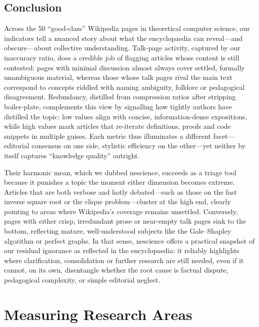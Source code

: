 \subsection{Conclusion}

Across the 50 “good-class” Wikipedia pages in theoretical computer science, our indicators tell a nuanced story about what the encyclopaedia can reveal—and obscure—about collective understanding.  Talk-page activity, captured by our inaccuracy ratio, does a credible job of flagging articles whose content is still contested: pages with minimal discussion almost always cover settled, formally unambiguous material, whereas those whose talk pages rival the main text correspond to concepts riddled with naming ambiguity, folklore or pedagogical disagreement. Redundancy, distilled from compression ratios after stripping boiler-plate, complements this view by signalling how tightly authors have distilled the topic: low values align with concise, information-dense expositions, while high values mark articles that re-iterate definitions, proofs and code snippets in multiple guises.  Each metric thus illuminates a different facet—editorial consensus on one side, stylistic efficiency on the other—yet neither by itself captures “knowledge quality” outright.

Their harmonic mean, which we dubbed nescience, succeeds as a triage tool because it punishes a topic the moment either dimension becomes extreme. Articles that are both verbose and hotly debated—such as those on the fast inverse square root or the clique problem—cluster at the high end, clearly pointing to areas where Wikipedia’s coverage remains unsettled. Conversely, pages with either crisp, irredundant prose or near-empty talk pages sink to the bottom, reflecting mature, well-understood subjects like the Gale–Shapley algorithm or perfect graphs. In that sense, nescience offers a practical snapshot of our residual ignorance as reflected in the encyclopaedia: it reliably highlights where clarification, consolidation or further research are still needed, even if it cannot, on its own, disentangle whether the root cause is factual dispute, pedagogical complexity, or simple editorial neglect.

%
%

\section{Measuring Research Areas}
\label{sec:measuring_research_areas}

